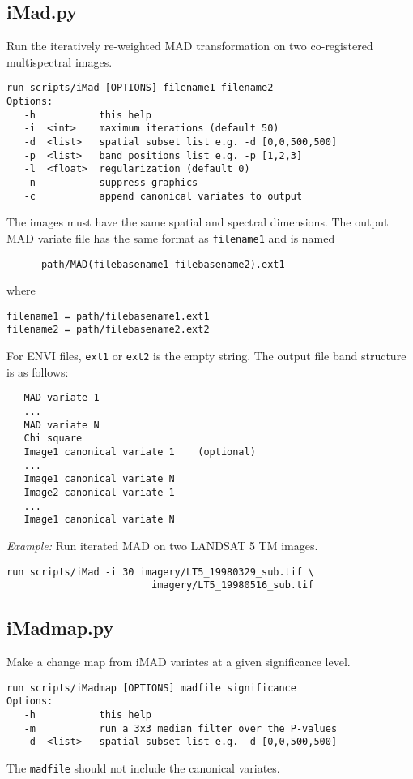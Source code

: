 \documentclass{paper}
\begin{document}
\subsection*{iMad.py}
Run the iteratively re-weighted MAD transformation on two co-registered multispectral images.
\begin{verbatim}
run scripts/iMad [OPTIONS] filename1 filename2
Options:
   -h           this help
   -i  <int>    maximum iterations (default 50)
   -d  <list>   spatial subset list e.g. -d [0,0,500,500]
   -p  <list>   band positions list e.g. -p [1,2,3]
   -l  <float>  regularization (default 0)
   -n           suppress graphics
   -c           append canonical variates to output
\end{verbatim}
The images must have the same spatial and spectral dimensions.
The output MAD variate file has the same format
as {\tt filename1} and is named
\begin{lstlisting}
      path/MAD(filebasename1-filebasename2).ext1
\end{lstlisting}
where
\begin{lstlisting}
filename1 = path/filebasename1.ext1
filename2 = path/filebasename2.ext2
\end{lstlisting}
For ENVI files, {\tt ext1} or {\tt ext2} is the empty string. The output file band structure is as follows:
\begin{verbatim}
   MAD variate 1
   ...
   MAD variate N
   Chi square
   Image1 canonical variate 1    (optional)
   ...
   Image1 canonical variate N
   Image2 canonical variate 1
   ...
   Image1 canonical variate N
\end{verbatim}
{\it Example:} Run iterated MAD on two LANDSAT 5 TM images.
\begin{lstlisting}
run scripts/iMad -i 30 imagery/LT5_19980329_sub.tif \
                         imagery/LT5_19980516_sub.tif
\end{lstlisting}








\subsection*{iMadmap.py}
Make a change map from iMAD variates at a given significance level.
\begin{verbatim}
run scripts/iMadmap [OPTIONS] madfile significance
Options:
   -h           this help
   -m           run a 3x3 median filter over the P-values
   -d  <list>   spatial subset list e.g. -d [0,0,500,500]
\end{verbatim}
The {\tt madfile} should not include the canonical variates.
\end{document}
